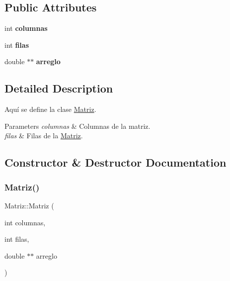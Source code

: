 \subsection*{Public Attributes}
\begin{DoxyCompactItemize}
\item 
\hypertarget{class_matriz_a7c034f5eb81585a62ac1331c2127ac19}{}\label{class_matriz_a7c034f5eb81585a62ac1331c2127ac19} 
int {\bfseries columnas}
\item 
\hypertarget{class_matriz_a0696de23c471bd7b02c3724aa007276d}{}\label{class_matriz_a0696de23c471bd7b02c3724aa007276d} 
int {\bfseries filas}
\item 
\hypertarget{class_matriz_aade346cceb6af6d14b85168a841e278a}{}\label{class_matriz_aade346cceb6af6d14b85168a841e278a} 
double $\ast$$\ast$ {\bfseries arreglo}
\end{DoxyCompactItemize}


\subsection{Detailed Description}
Aquí se define la clase \hyperlink{class_matriz}{Matriz}. 


\begin{DoxyParams}{Parameters}
{\em columnas} & Columnas de la matriz. \\
\hline
{\em filas} & Filas de la \hyperlink{class_matriz}{Matriz}. \\
\hline
\end{DoxyParams}


\subsection{Constructor \& Destructor Documentation}
\hypertarget{class_matriz_a559cdf7b75f2af6046a61ccf85d15091}{}\label{class_matriz_a559cdf7b75f2af6046a61ccf85d15091} 
\subsubsection{\texorpdfstring{Matriz()}{Matriz()}\hspace{0.1cm}{\footnotesize\ttfamily [1/2]}}
{\ttfamily Matriz\+::\+Matriz (\begin{DoxyParamCaption}\item[{int}]{columnas,  }\item[{int}]{filas,  }\item[{double $\ast$$\ast$}]{arreglo }\end{DoxyParamCaption})}




